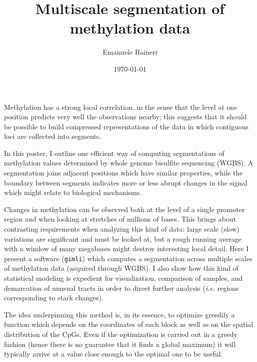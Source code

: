 \documentclass[12pt]{amsart}
\newcommand{\gimli}{\texttt{gimli}}
\newcommand{\ie}{\textit{i.e.}}
\begin{document}
\title{Multiscale segmentation of methylation data}
\author{Emanuele Raineri}
\date{\today}
\maketitle

Methylation has a strong local correlation,
in the sense that the level at one position predicts 
very well the observations nearby; this suggests that it should be possible
to build compressed representations of the data in which contiguous loci 
are collected into segments.

In this poster, I outline one efficient way of computing 
segmentations of methylation values determined by 
whole genome bisulfite sequencing (WGBS).
A segmentation joins adjacent positions
which have similar properties, while the boundary between segments 
indicates more or less abrupt changes
in the signal which might relate to biological mechanisms. 

Changes in methylation can be observed both at the level of a single promoter
region  and when looking at stretches
of millions of bases.
This brings about contrasting requirements when analyzing this kind of data: 
large scale (slow) variations are 
significant and must be looked at, but a rough
running average with a window of many megabases might destroy interesting
local detail. Here I present  a software (\gimli{}) which computes a 
segmentation across multiple scales of methylation 
data (acquired through WGBS).
I also show how this 
kind of statistical modeling is expedient for 
visualization, comparison of samples,
and demarcation of unusual tracts in 
order to direct further analysis 
(\ie{} regions corresponding to stark changes).

The idea underpinning this method is, in its essence, to optimize  
greedily a function which depends on the coordinates
of each block as well as on the spatial distribution of the CpGs.
Even if the optimization is carried out
in a greedy fashion (hence there is no guarantee
that it finds a global maximum) 
it will typically arrive at a value close enough to the optimal 
one to be useful.
\end{document}
